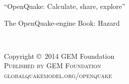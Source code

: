 \documentclass[11pt,fleqn]{book} %
\begin{document}



\begingroup
\thispagestyle{empty}
\par\normalfont\fontsize{15}{15}\sffamily\selectfont
“OpenQuake: Calculate, share, explore”
\centering
\vspace*{9cm}
\par\normalfont\fontsize{35}{35}\sffamily\selectfont
The OpenQuake-engine Book: Hazard\par %
\endgroup


\newpage
~\vfill
\thispagestyle{empty}

\noindent Copyright \copyright\ 2014 GEM Foundation\\ %

\noindent \textsc{Published by GEM Foundation}\\ %

\noindent \textsc{globalquakemodel.org/openquake}\\ %
\end{document}
